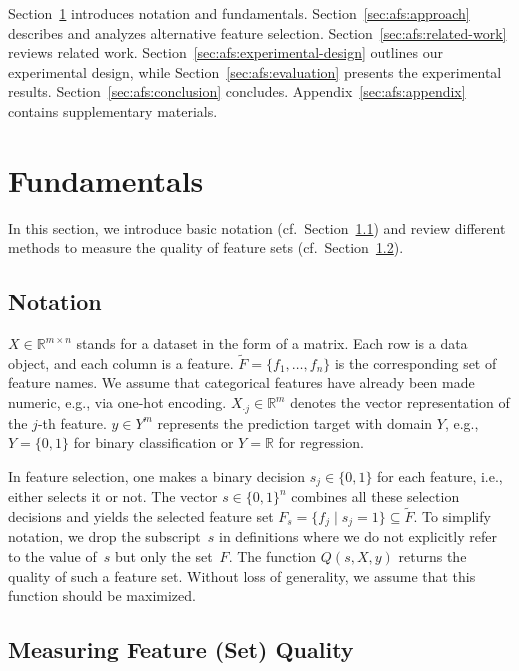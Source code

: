 \documentclass{article}
\theoremstyle{definition}
\begin{document}
Section~\ref{sec:afs:fundamentals} introduces notation and fundamentals.
Section~\ref{sec:afs:approach} describes and analyzes alternative feature selection.
Section~\ref{sec:afs:related-work} reviews related work.
Section~\ref{sec:afs:experimental-design} outlines our experimental design, while Section~\ref{sec:afs:evaluation} presents the experimental results.
Section~\ref{sec:afs:conclusion} concludes.
Appendix~\ref{sec:afs:appendix} contains supplementary materials.

\section{Fundamentals}
\label{sec:afs:fundamentals}

In this section, we introduce basic notation (cf.~Section~\ref{sec:afs:fundamentals:notation}) and review different methods to measure the quality of feature sets (cf.~Section~\ref{sec:afs:fundamentals:quality}).

\subsection{Notation}
\label{sec:afs:fundamentals:notation}

$X \in \mathbb{R}^{m \times n}$ stands for a dataset in the form of a matrix.
Each row is a data object, and each column is a feature.
$\tilde{F} = \{f_1, \dots, f_n\}$ is the corresponding set of feature names.
We assume that categorical features have already been made numeric, e.g., via one-hot encoding.
$X_{\cdot{}j} \in \mathbb{R}^m$ denotes the vector representation of the $j$-th feature.
$y \in Y^m$ represents the prediction target with domain $Y$, e.g., $Y=\{0,1\}$ for binary classification or $Y=\mathbb{R}$ for regression.

In feature selection, one makes a binary decision $s_j \in \{0,1\}$ for each feature, i.e., either selects it or not.
The vector $s \in \{0,1\}^n$ combines all these selection decisions and yields the selected feature set $F_s = \{f_j \mid s_j=1\} \subseteq \tilde{F}$.
To simplify notation, we drop the subscript~$s$ in definitions where we do not explicitly refer to the value of~$s$ but only the set~$F$.
The function $Q(s,X,y)$ returns the quality of such a feature set.
Without loss of generality, we assume that this function should be maximized.

\subsection{Measuring Feature (Set) Quality}
\label{sec:afs:fundamentals:quality}
\end{document}
